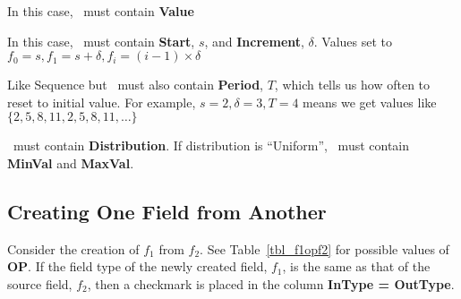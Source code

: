 \bd
\item [Constant] In this case, \Args\ must contain {\bf Value}
\item [Sequence] In this case, \Args\ must contain {\bf Start}, \(s\), and {\bf Increment},
\(\delta\). Values set to 
\(f_0 = s, f_1 = s+ \delta, f_i = (i-1) \times \delta\)
\item [Period] Like Sequence but \Args\ must also contain {\bf Period}, 
\(T\), which tells
us how often to reset to initial value. For example, \(s = 2, \delta = 3, T =
4\) means we get values like \(\{2, 5, 8, 11, 2, 5, 8, 11, \ldots\}\)
\item [Random] \Args\ must contain {\bf Distribution}. If distribution is
``Uniform'', \Args\ must contain {\bf MinVal} and {\bf MaxVal}. 
\ed


\subsection{Creating One Field from Another}
\label{f1opf2}

Consider the creation of \(f_1\) from \(f_2\). 
See Table~\ref{tbl_f1opf2} for possible values of {\bf OP}. 
If the field type of
the newly created field, \(f_1\), is the same as that of the source field,
\(f_2\),  then a checkmark is placed in the column {\bf InType = OutType}.

